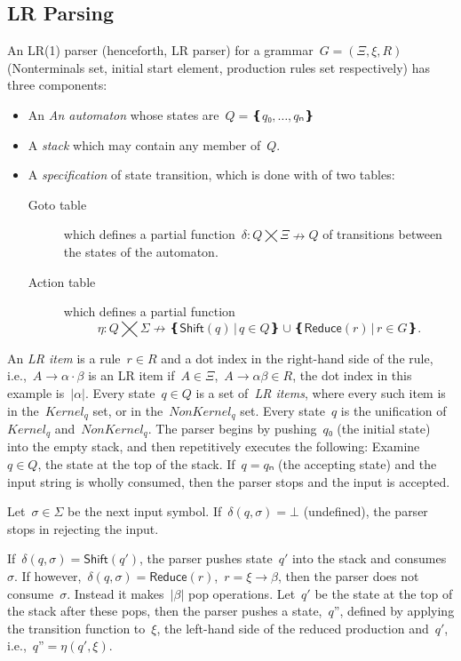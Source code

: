 \subsection{LR Parsing}
An LR(1) parser (henceforth, LR parser) for a grammar~$G=(Ξ,ξ,R)$
  (Nonterminals set, initial start element, production rules set respectively)
  has three components:
\begin{itemize}
  \item An \emph{An automaton} whose states are~$Q=❴q₀,…,qₙ❵$
  \item A \emph{stack} which may contain any member of~$Q$.
\item A \emph{specification} of state transition, 
    which is done with of two tables:
  \begin{description}
    \item[Goto table] which defines a partial function~$δ:Q⨉Ξ↛Q$ of transitions
    between the states of the automaton.
    \item[Action table] which
    defines a partial function\[η:Q⨉Σ↛ ❴ \textsf{Shift}(q) \,|\, q∈Q❵ ∪ ❴\textsf{Reduce}(r) \,| \, r∈G❵.\]
  \end{description}
\end{itemize}
An \emph{LR item} is a rule~$r∈R$ and a dot index in the right-hand side of the rule,
  i.e.,~$A→α·β$ is an LR item if~$A∈Ξ$,~$A→αβ∈R$,
  the dot index in this example is~$|α|$.
Every state~$q∈Q$ is a set of~\emph{LR items},
  where every such item is in the~$Kernel_{q}$ set,
  or in the~$NonKernel_{q}$ set.
Every state~$q$ is the unification of~$Kernel_{q}$ and~$NonKernel_{q}$.
The parser begins by pushing~$q₀$ (the initial state) into the empty stack,
and then repetitively executes the following:
Examine~$q∈Q$, the state at the top of the stack.
If~$q=qₙ$ (the accepting state) and the input string is wholly consumed, then the parser stops and the input is accepted.

Let~$σ∈Σ$ be the next input symbol.
If~$δ(q,σ)=⊥$ (undefined), the parser stops in rejecting the input.

If~$δ(q,σ) = \textsf{Shift}(q')$, the parser pushes state~$q'$
into the stack and consumes~$σ$.
If however,~$δ(q,σ) = \textsf{Reduce}(r)$,~$r=ξ→β$,
then the parser does not consume~$σ$.
Instead it makes~$|β|$ pop operations.
Let~$q'$ be the state at the top of the stack after these pops, then
the parser pushes a state,~$q”$,
defined by applying the transition function to~$ξ$, the left-hand side of the reduced production and~$q'$,
i.e.,~$q”=η(q',ξ)$.


